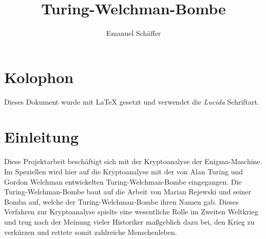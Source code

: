 \documentclass[ngerman, a4paper, footsepline, headsepline, 9pt]{scrreport}
\begin{document}
	\setcounter{page}{1}
	
	\subject{Projektarbeit zur Kryptoanalyse der Enigma-Maschine durch eine\\ Software-Nachbildung der Turing-Welchman-Bombe\\
	der Fakultät Elektrotechnik und Informatik}
	\title{Turing-Welchman-Bombe}
	\author{Emanuel Schäffer}
	\publishers{RWU--University of Applied Sciences\\Prof. Dipl.-Math. Ekkehard Löhmann}
	\maketitle
	
	\cleardoublepage
	\chapter*{Kolophon}
	Dieses Dokument wurde mit \LaTeX{} gesetzt und verwendet die \textsl{Lucida} Schriftart.
	
	\cleardoublepage
	\tableofcontents
	
	\chapter*{Einleitung}\label{ch:einleitung}
	Diese Projektarbeit beschäftigt sich mit der Kryptoanalyse der Enigma-Maschine.
	Im Speziellen wird hier auf die Kryptoanalyse mit der von Alan Turing und Gordon Welchman entwickelten \glqq Turing-Welchman-Bombe\grqq{} eingegangen.
	Die Turing-Welchman-Bombe baut auf die Arbeit von Marian Rejewski und seiner \glqq Bomba\grqq{} auf, welche der Turing-Welchman-Bombe ihren Namen gab.
	Dieses Verfahren zur Kryptoanalyse spielte eine wesentliche Rolle im Zweiten Weltkrieg und trug nach der Meinung vieler Historiker maßgeblich dazu bei, den Krieg zu verkürzen und rettete somit zahlreiche Menschenleben.
	
	\cleardoublepage
	\setcounter{page}{1}
	
	
	
	
	
	
	
	
	
%	
	
\end{document}
